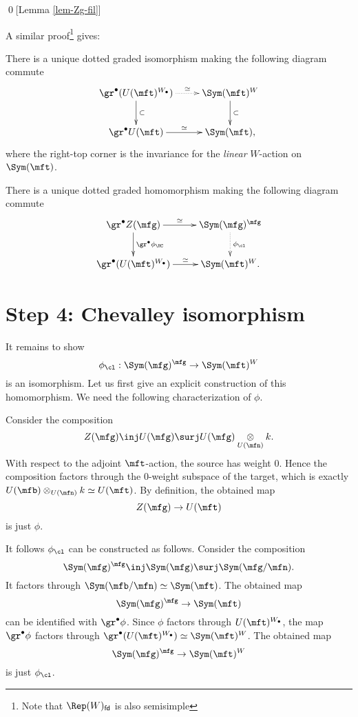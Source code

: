 	\qed[Lemma \ref{lem-Zg-fil}]
	
	A similar proof\footnote{Note that $\Rep(W)_\mathsf{fd}$ is also semisimple} gives:

	\begin{lem}
	\label{lem-UtW-fil}
		There is a unique dotted graded isomorphism making the following diagram commute
		\[
			\xymatrix{
				\gr^\bullet (U(\mft)^{W_\bullet}) \ar@{.>}[r]^-\simeq \ar[d]^-\subset
				& \Sym(\mft)^W \ar[d]^-\subset \\
				\gr^\bullet U(\mft) \ar[r]^-\simeq 
				& \Sym(\mft),
			}
		\]
		where the right-top corner is the invariance for the \emph{linear} $W$-action on $\Sym(\mft)$.
	\end{lem}

	\begin{cor}
		There is a unique dotted graded homomorphism making the following diagram commute
		\[
			\xymatrix{
				\gr^\bullet Z(\mfg) \ar[r]^-\simeq \ar[d]^-{\gr^\bullet \phi_\HC}
				& \Sym(\mfg)^\mfg \ar@{.>}[d]^-{\phi_\cl} \\
				\gr^\bullet (U(\mft)^{W_\bullet})  \ar[r]^-\simeq 
				& \Sym(\mft)^W.
			}
		\]
	\end{cor}

\section{Step 4: Chevalley isomorphism}
	It remains to show
	\[
		\phi_\cl: \Sym(\mfg)^\mfg \to \Sym(\mft)^W
	\]
	is an isomorphism. Let us first give an explicit construction of this homomorphism. We need the following characterization of $\phi$.

	\begin{constr}
		Consider the composition
		\[
			Z(\mfg) \inj U(\mfg) \surj  U(\mfg) \ot_{U(\mfn)} k.
		\]
		With respect to the adjoint $\mft$-action, the source has weight $0$. Hence the composition factors through the $0$-weight subspace of the target, which is exactly $U(\mfb) \ot_{U(\mfn)} k \simeq U(\mft)$. By definition, the obtained map
		\[
			Z(\mfg) \to U(\mft)
		\] 
		is just $\phi$.
	\end{constr}

	\begin{constr}
		It follows $\phi_\cl$ can be constructed as follows. Consider the composition
		\begin{equation}
			\label{eqn-3}
			\Sym(\mfg)^\mfg \inj \Sym(\mfg) \surj \Sym(\mfg/\mfn).
		\end{equation}
		It factors through $\Sym(\mfb/\mfn)\simeq \Sym(\mft)$. The obtained map
		\[
			\Sym(\mfg)^\mfg  \to  \Sym(\mft)
		\]
		can be identified with $\gr^\bullet \phi$. Since $\phi$ factors through $U(\mft)^{W_\bullet}$, the map $\gr^\bullet \phi$ factors through $\gr^\bullet(U(\mft)^{W_\bullet}) \simeq \Sym(\mft)^W$. The obtained map 
		\[
			\Sym(\mfg)^\mfg  \to  \Sym(\mft)^W
		\]
		is just $\phi_\cl$.
	\end{constr}
 
